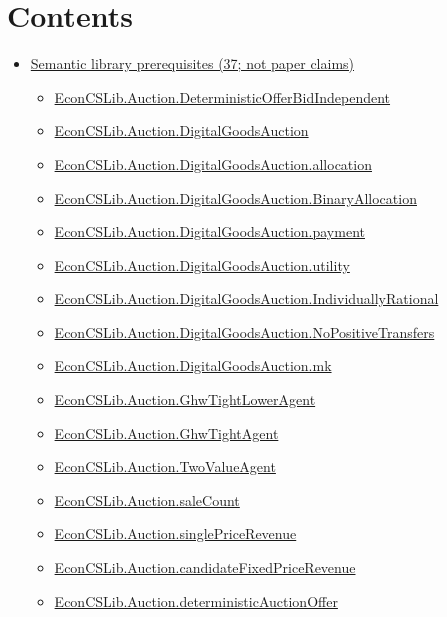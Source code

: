 \documentclass[10pt]{article}
\begin{document}
\section*{Contents}
\begin{itemize}[leftmargin=1.2em]
\item \hyperlink{library-section-71038f49777edb65}{Semantic library prerequisites (37; not paper claims)}
\begin{itemize}[leftmargin=1.2em]
\item \hyperlink{library-prerequisite-a930053d36ca61f9}{EconCSLib.Auction.DeterministicOfferBidIndependent}
\item \hyperlink{library-prerequisite-2c40bbb5598d1a85}{EconCSLib.Auction.DigitalGoodsAuction}
\item \hyperlink{library-prerequisite-d904dd5b0f1471b3}{EconCSLib.Auction.DigitalGoodsAuction.allocation}
\item \hyperlink{library-prerequisite-76d477754469d363}{EconCSLib.Auction.DigitalGoodsAuction.BinaryAllocation}
\item \hyperlink{library-prerequisite-2c1f6189bbb30ece}{EconCSLib.Auction.DigitalGoodsAuction.payment}
\item \hyperlink{library-prerequisite-23ca3998864e8e27}{EconCSLib.Auction.DigitalGoodsAuction.utility}
\item \hyperlink{library-prerequisite-7d4e9c39b7817429}{EconCSLib.Auction.DigitalGoodsAuction.IndividuallyRational}
\item \hyperlink{library-prerequisite-de1b10a865ffeb8c}{EconCSLib.Auction.DigitalGoodsAuction.NoPositiveTransfers}
\item \hyperlink{library-prerequisite-2bd7cf5ef107f1c4}{EconCSLib.Auction.DigitalGoodsAuction.mk}
\item \hyperlink{library-prerequisite-605b1618dff75e78}{EconCSLib.Auction.GhwTightLowerAgent}
\item \hyperlink{library-prerequisite-ea6fcf3a24ab4ad3}{EconCSLib.Auction.GhwTightAgent}
\item \hyperlink{library-prerequisite-0ffec39ee2901bb9}{EconCSLib.Auction.TwoValueAgent}
\item \hyperlink{library-prerequisite-c46e5d821b494572}{EconCSLib.Auction.saleCount}
\item \hyperlink{library-prerequisite-42acfd497692c3c6}{EconCSLib.Auction.singlePriceRevenue}
\item \hyperlink{library-prerequisite-0ad3f8cc830197ef}{EconCSLib.Auction.candidateFixedPriceRevenue}
\item \hyperlink{library-prerequisite-13bd8295eba9f252}{EconCSLib.Auction.deterministicAuctionOffer}

\end{itemize}
\end{itemize}
\end{document}
